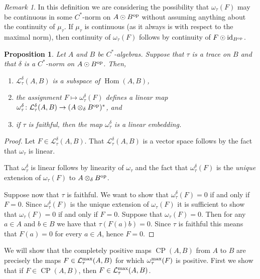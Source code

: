 \documentclass[11pt, a4paper, oneside, final, reqno]{amsart}
\newcommand{\calL}{\mathcal{L}}
\newcommand{\Hom}{\operatorname{Hom}}
\newcommand{\CP}{\operatorname{CP}}
\newcommand{\id}{\operatorname{id}}
\theoremstyle{definition}
\theoremstyle{plain}
\newtheorem{proposition}[definition]{Proposition}
\theoremstyle{remark}
\newtheorem{remark}[definition]{Remark}
\numberwithin{equation}{section}
\begin{document}
\begin{remark}
    In this definition we are considering the possibility that $\omega_\tau(F)$ may be continuous in some $C^*$-norm on $A \odot B^{\rm op}$ without assuming anything about the continuity of $\mu_\tau$. If $\mu_\tau$ is continuous (as it always is with respect to the maximal norm), then continuity of $\omega_\tau(F)$ follows by continuity of $F \odot \id_{B^{\rm op}}$.
\end{remark}

\begin{proposition}\label{prop:properties of maps with cont associated functional}
    Let $A$ and $B$ be $C^*$-algebras. Suppose that $\tau$ is a trace on $B$ and that $\delta$ is a $C^*$-norm on $A \odot B^{\rm op}$. Then,
    \begin{enumerate}
        \item $\calL_\tau^\delta(A,B)$ is a subspace of $\Hom(A,B)$,
        \item the assignment $F \mapsto \omega_\tau^\delta(F)$ defines a linear map $\omega_\tau^\delta \colon \calL_\tau^\delta(A,B) \to (A \otimes_\delta B^{\rm op})^*$, and
        \item if $\tau$ is faithful, then the map $\omega_\tau^\delta$ is a linear embedding.
    \end{enumerate}
\end{proposition}
\begin{proof}
    Let $F \in \calL_\tau^\delta(A,B)$. That $\calL_\tau^\delta(A,B)$ is a vector space follows by the fact that $\omega_\tau$ is linear.

    That $\omega_\tau^\delta$ is linear follows by linearity of $\omega_\tau$ and the fact that $\omega_\tau^\delta(F)$ is the \emph{unique} extension of $\omega_\tau(F)$ to $A \otimes_\delta B^{\rm op}$.

    Suppose now that $\tau$ is faithful. We want to show that $\omega_\tau^\delta(F) = 0$ if and only if $F = 0$. Since $\omega_\tau^\delta(F)$ is the unique extension of $\omega_\tau(F)$ it is sufficient to show that $\omega_\tau(F) = 0$ if and only if $F = 0$. Suppose that $\omega_\tau(F) = 0$. Then for any $a \in A$ and $b \in B$ we have that $\tau(F(a)b) = 0$. Since $\tau$ is faithful this means that $F(a) = 0$ for every $a \in A$, hence $F = 0$.
\end{proof}

We will show that the completely positive maps $\CP(A,B)$ from $A$ to $B$ are precisely the maps $F \in \calL_\tau^{\rm max}(A,B)$ for which $\omega_\tau^{\rm max}(F)$ is positive. First we show that if $F \in \CP(A,B)$, then $F \in \calL_\tau^{\rm max}(A,B)$.
\end{document}
